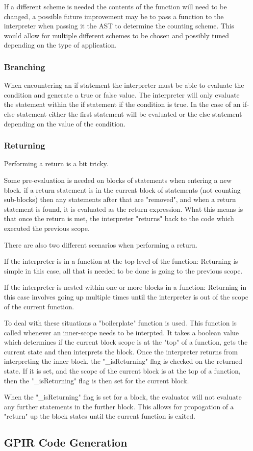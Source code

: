 If a different scheme is needed the contents of the function will need to be changed,
a possible future improvement may be to pass a function to the interpreter when passing
it the AST to determine the counting scheme. This would allow for multiple different schemes
to be chosen and possibly tuned depending on the type of application.


\subsubsection{Branching}
When encountering an if statement the interpreter must be able to evaluate the condition and generate a
true or false value. The interpreter will only evaluate the statement within the if statement
if the condition is true. In the case of an if-else statement either the first statement will
be evaluated or the else statement depending on the value of the condition.


\subsubsection{Returning}
Performing a return is a bit tricky. 

Some pre-evaluation is needed  on blocks of statements when entering a 
new block. if a return statement is
in the current block of statements (not counting sub-blocks) then
any statements after that are "removed", and when a return statement
is found, it is evaluated as the return expression.
What this means is that once the return is met, the interpreter
"returns" back to the code which executed the previous scope.

There are also two different scenarios when performing a return.

If the interpreter is in a function at the top level of the function:
Returning is simple in this case, all that is needed to be done is
going to the previous scope.

If the interpreter is nested within one or more blocks in a function:
Returning in this case involves going up multiple times until the interpreter
is out of the scope of the current function.

To deal with these situations a "boilerplate" function is used. This function
is called whenever an inner-scope needs to be interpted. It
takes a boolean value which determines if the current block scope is at
the "top" of a function, gets the current state and then interprets the block.
Once the interpreter returns from interpreting the inner block, the "\_isReturning"
flag is checked on the returned state. If it is set, and the scope
of the current block is at the top of a function, then the "\_isReturning" flag
is then set for the current block.
 
When the "\_isReturning" flag is set for a block, the evaluator will not evaluate
any further statements in the further block. This allows for propogation of a "return"
up the block states until the current function is exited.

\subsection{GPIR Code Generation}





